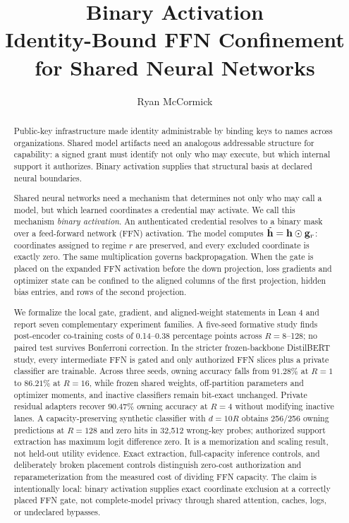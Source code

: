 \documentclass[11pt]{article}
\title{\textbf{Binary Activation}\\
\large Identity-Bound FFN Confinement for Shared Neural Networks}
\author[1]{Ryan McCormick}
\affil[1]{Independent Researcher}
\begin{document}
\maketitle

\begin{abstract}
Public-key infrastructure made identity administrable by binding keys to names
across organizations. Shared model artifacts need an analogous addressable
structure for capability: a signed grant must identify not only who may execute,
but which internal support it authorizes. Binary activation supplies that
structural basis at declared neural boundaries.

Shared neural networks need a mechanism that determines not only who may call a
model, but which learned coordinates a credential may activate. We call this
mechanism \emph{binary activation}. An authenticated credential resolves to a
binary mask over a feed-forward network (FFN) activation. The model computes
$\tilde{\mathbf{h}}=\mathbf{h}\odot\mathbf{g}_r$: coordinates assigned to regime $r$ are preserved,
and every excluded coordinate is exactly zero. The same multiplication governs
backpropagation. When the gate is placed on the expanded FFN activation before
the down projection, loss gradients and optimizer state can be confined to the
aligned columns of the first projection, hidden bias entries, and rows of the
second projection.

We formalize the local gate, gradient, and aligned-weight statements in Lean 4
and report seven complementary experiment families. A five-seed formative study
finds post-encoder co-training costs of 0.14--0.38 percentage points across
$R=8$--128; no paired test survives Bonferroni correction. In the stricter
frozen-backbone DistilBERT study, every intermediate
FFN is gated and only authorized FFN slices plus a private classifier are
trainable. Across three seeds, owning accuracy falls from $91.28\%$ at $R=1$ to
$86.21\%$ at $R=16$, while frozen shared weights, off-partition parameters and
optimizer moments, and inactive classifiers remain bit-exact unchanged. Private
residual adapters recover $90.47\%$ owning accuracy at $R=4$ without modifying
inactive lanes. A capacity-preserving synthetic classifier with $d=10R$ obtains
256/256 owning predictions at $R=128$ and zero hits in 32,512 wrong-key probes;
authorized support extraction has maximum logit difference zero. It is a
memorization and scaling result, not held-out utility evidence. Exact
extraction, full-capacity inference controls, and
deliberately broken placement controls distinguish zero-cost authorization and
reparameterization from the measured cost of dividing FFN capacity. The claim
is intentionally local: binary activation supplies exact coordinate exclusion
at a correctly placed FFN gate, not complete-model privacy through shared
attention, caches, logs, or undeclared bypasses.
\end{abstract}
\end{document}
